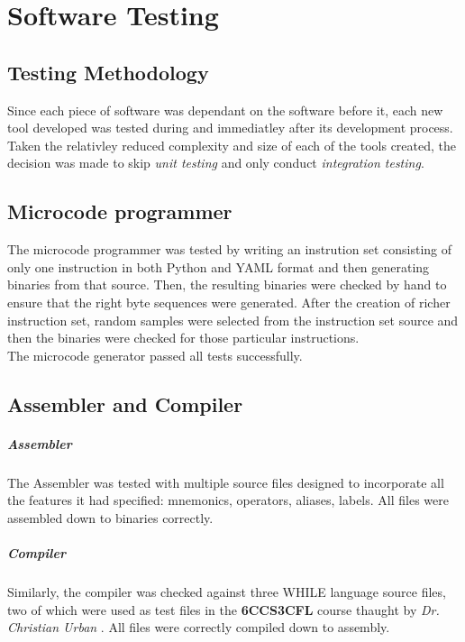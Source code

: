 \chapter{Software Testing}

\section{Testing Methodology}
Since each piece of software was dependant on the software before it, each new tool
developed was tested during and immediatley after its development process. Taken
the relativley reduced complexity and size of each of the tools created, the decision
was made to skip \emph{unit testing} and only conduct \emph{integration testing}.

\section{Microcode programmer}
The microcode programmer was tested by writing an instrution set consisting of only one instruction
in both Python and YAML format and then generating binaries from that source. Then, the resulting
binaries were checked by hand to ensure that the right byte sequences were generated. After the
creation of richer instruction set, random samples were selected from the instruction set source
and then the binaries were checked for those particular instructions. \\
The microcode generator passed all tests successfully.

\section{Assembler and Compiler}

\paragraph{Assembler}
The Assembler was tested with multiple source files designed to incorporate all the features it
had specified: mnemonics, operators, aliases, labels. All files were assembled down to binaries
correctly.

\paragraph{Compiler}
Similarly, the compiler was checked against three WHILE language source files, two of which were used
as test files in the \textbf{6CCS3CFL} course thaught by \emph{Dr. Christian Urban} \cite{6ccs3cfl}.
All files were correctly compiled down to assembly.

